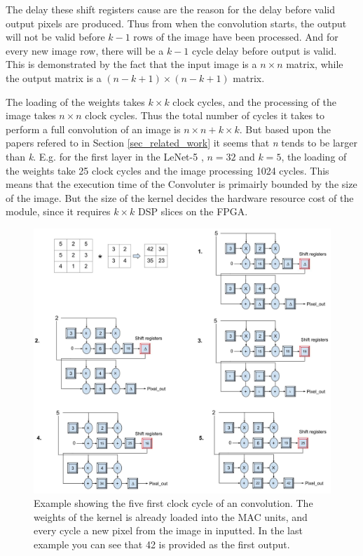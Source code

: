 The delay these shift registers cause are the reason for the delay before valid output pixels are produced. Thus from when the convolution starts, the output will not be valid before $ k-1 $ rows of the image have been processed. And for every new image row, there will be a $ k-1 $ cycle delay before output is valid. This is demonstrated by the fact that the input image is a $ n \times n $ matrix, while the output matrix is a $ (n-k+1) \times (n-k+1) $ matrix. 

The loading of the weights takes $ k \times k $ clock cycles, and the processing of the image takes $ n \times n $ clock cycles. Thus the total number of cycles it takes to perform a full convolution of an image is $ n \times n + k \times k $. But based upon the papers refered to in Section \ref{sec_related_work} it seems that \textit{n} tends to be larger than \textit{k}. E.g. for the first layer in the LeNet-5 \cite{LeCun1998}, $ n = 32 $ and $ k = 5 $, the loading  of the weights take 25 clock cycles and the image processing 1024 cycles. This means that the execution time of the Convoluter is primairly bounded by the size of the image. But the size of the kernel decides the hardware resource cost of the module, since it requires $ k \times k $ DSP slices on the FPGA.

\begin{figure}[h!]
  \centering
      \includegraphics[width=1.1\textwidth]{Figures/Method/Conv_example}
  \caption{Example showing the five first clock cycle of an convolution. The weights of the kernel is already loaded into the MAC units, and every cycle a new pixel from the image in inputted. In the last example you can see that 42 is provided as the first output.}
\end{figure}


